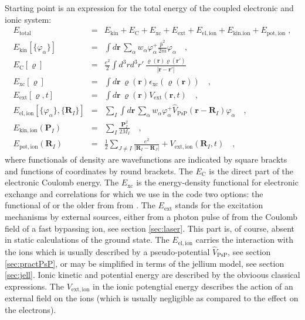 \documentclass[final,1p]{elsarticle}
\begin{document}
Starting point is an expression for the total energy of the coupled
electronic and ionic system:
\begin{subequations}
\label{eq:Etotal}
\begin{eqnarray}
  E_\mathrm{total}
  &=&
  E_\mathrm{kin}
  +
  E_\mathrm{C}
  +
  E_\mathrm{xc}
  +
  E_\mathrm{ext}
  +
  E_\mathrm{el,ion}
  +
  E_\mathrm{kin.ion}
  +
  E_\mathrm{pot,ion}
  \;,
\\
  E_\mathrm{kin}[\{\varphi_\alpha\}]
  &=&
  \int d\mathbf{r}\,\sum_\alpha w_\alpha
  \varphi_\alpha^+\frac{\hat{p}^2}{2m}\varphi_\alpha^{\mbox{}}
  \quad,
\label{eq:Ekin}
\\
  E_\mathrm{C}[\varrho]
  &=&
  \frac{e^2}{2}\int d^3rd^3r'\,
  \frac{\varrho(\mathbf{r})\varrho(\mathbf{r}')}{|\mathbf{r}-\mathbf{r}'|}
\\
  E_\mathrm{xc}[\varrho]
  &=&
  \int d\mathbf{r}\,\varrho(\mathbf{r})
  \epsilon_\mathrm{xc}\left(\varrho(\mathbf{r})\right)
  \quad,
\\
  E_\mathrm{ext}[\varrho,t]
  &=&
  \int d\mathbf{r}\,\varrho(\mathbf{r})V_\mathrm{ext}(\mathbf{r},t)
  \quad,
\\
  E_\mathrm{el,ion}[\{\varphi_\alpha\},\{\mathbf{R}_I\}]
  &=&
  \sum_I\int d\mathbf{r}\,\sum_\alpha w_\alpha
  \varphi_\alpha^+
  \hat{V}_\mathrm{PsP}(\mathbf{r}-\mathbf{R}_I)\varphi_\alpha^{\mbox{}}
  \quad,
\\
  E_\mathrm{kin,ion}(\mathbf{P}_I)
  &=&
  \sum_I\frac{\mathbf{P}_I^2}{2M_I}
  \quad,
\\
  E_\mathrm{pot,ion}(\mathbf{R}_I)
  &=&
  \frac{1}{2}\sum_{J\neq I}\frac{e^2}{|\mathbf{R}_I-\mathbf{R}_J|}
  +
  V_\mathrm{ext,ion}(\mathbf{R}_I,t)
  \quad,
\end{eqnarray}
\end{subequations}
where functionals of density are wavefunctions are indicated by square
brackts and functions of coordinates by round brackets.  The
$E_\mathrm{C}$ is the direct part of the electronic Coulomb energy.
The $E_\mathrm{xc}$ is the energy-density functional for electronic
exchange and correlations for which we use in the code two options:
the functional of \cite{Per92} or the older from from \cite{Gun76}.
The $E_\mathrm{ext}$ stands for the excitation mechanisms by external
sources, either from a photon pulse of from the Coulomb field of a
fast bypassing ion, see section \ref{sec:laser}. This part is, of
course, absent in static calculations of the ground state.  The
$E_\mathrm{el,ion}$ carries the interaction with the ions which is
usually described by a pseudo-potential $\hat{V}_\mathrm{PsP}$, see
section \ref{sec:practPsP}, or may be simplified in terms of the
jellium model, see section \ref{sec:jell}.  Ionic kinetic and
potential energy are described by the obvioous classical expressions.
The $V_\mathrm{ext,ion}$ in the ionic potengtial energy describes the
action of an external field on the ions (which is usually negligible
as compared to the effect on the electrons).
\end{document}
